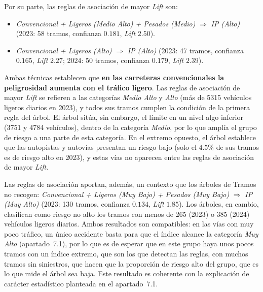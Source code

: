 \documentclass[twoside,a4paper,12pt,onecolumn,openany]{book}
\begin{document}
Por su parte, las reglas de asociación de mayor \textit{Lift} son:
 
\begin{itemize}
    \item \textit{Convencional + Ligeros (Medio Alto) + Pesados (Medio)} $\Rightarrow$ \textit{IP (Alto)} (2023: 58 tramos, confianza $0.181$, \textit{Lift} $2.50$).
    \item \textit{Convencional + Ligeros (Alto)} $\Rightarrow$ \textit{IP (Alto)} (2023: 47 tramos, confianza $0.165$, \textit{Lift} $2.27$; 2024: 50 tramos, confianza $0.179$, \textit{Lift} $2.39$).
\end{itemize}
 
Ambas técnicas establecen que \textbf{en las carreteras convencionales la peligrosidad aumenta con el tráfico ligero}. Las reglas de asociación de mayor \textit{Lift} se refieren a las categorías \textit{Medio Alto} y \textit{Alto} (más de 5315 vehículos ligeros diarios en 2023), y todos sus tramos cumplen la condición de la primera regla del árbol. El árbol sitúa, sin embargo, el límite en un nivel algo inferior (3751 y 4784 vehículos), dentro de la categoría \textit{Medio}, por lo que amplía el grupo de riesgo a una parte de esta categoría. En el extremo opuesto, el árbol establece que las autopistas y autovías presentan un riesgo bajo (solo el $4.5\%$ de sus tramos es de riesgo alto en 2023), y estas vías no aparecen entre las reglas de asociación de mayor \textit{Lift}.
 
\vspace{0.5cm}
 
Las reglas de asociación aportan, además, un contexto que los árboles de Tramos no recogen: \textit{Convencional + Ligeros (Muy Bajo) + Pesados (Muy Bajo)} $\Rightarrow$ \textit{IP (Muy Alto)} (2023: 130 tramos, confianza $0.134$, \textit{Lift} $1.85$). Los árboles, en cambio, clasifican como riesgo no alto los tramos con menos de 265 (2023) o 385 (2024) vehículos ligeros diarios. Ambos resultados son compatibles: en las vías con muy poco tráfico, un único accidente basta para que el índice alcance la categoría \textit{Muy Alto} (apartado~7.1), por lo que es de esperar que en este grupo haya unos pocos tramos con un índice extremo, que son los que detectan las reglas, con muchos tramos sin siniestros, que hacen que la proporción de riesgo alto del grupo, que es lo que mide el árbol sea baja. Este resultado es coherente con la explicación de carácter estadístico planteada en el apartado~7.1.
 
\vspace{0.5cm}
 
\end{document}

